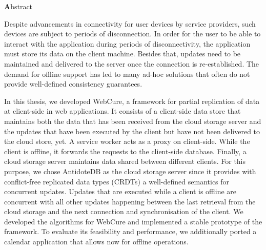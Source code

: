 \begin{center}
{\Large \textbf Abstract}
\end{center}
\vspace{1cm}

Despite advancements in connectivity for user devices by service providers, such devices are subject to periods of disconnection. In order for the user to be able to interact with the application during periods of disconnectivity, the application must store its data on the client machine. Besides that, updates need to be maintained and delivered to the server once the connection is re-established. The demand for offline support has led to many ad-hoc solutions that often do not provide well-defined consistency guarantees. 

In this thesis, we developed WebCure, a framework for partial replication of data at client-side in web applications. It consists of a client-side data store that maintains both the data that has been received from the cloud storage server and the updates that have been executed by the client but have not been delivered to the cloud store, yet. A service worker acts as a proxy on client-side. While the client is offline, it forwards the requests to the client-side database. Finally, a cloud storage server maintains data shared between different clients. For this purpose, we chose AntidoteDB as the cloud storage server since it provides with conflict-free replicated data types (CRDTs) a well-defined semantics for concurrent updates. Updates that are executed while a client is offline are concurrent with all other updates happening between the last retrieval from the cloud storage and the next connection and synchronisation of the client. We developed the algorithms for WebCure and implemented a stable prototype of the framework. To evaluate its feasibility and performance, we additionally ported a calendar application that allows now for offline operations.